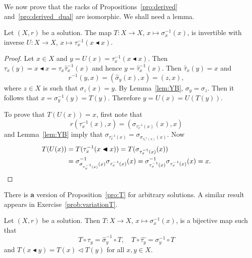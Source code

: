 We now prove that the racks 
of Propositions~\ref{pro:derived} 
and~\ref{pro:derived_dual} are isomorphic. 
We shall need a lemma. 



\begin{lemma}
\label{lem:T_invertible}
Let $(X,r)$ be a solution. 
The map $T\colon X\to X$, $x\mapsto\sigma_x^{-1}(x)$, is invertible with
inverse $U\colon X\to X$, $x\mapsto\tau^{-1}_x(x\blacktriangleleft x)$. 
\end{lemma}

\begin{proof}
Let $x\in X$ and $y=U(x)=\tau^{-1}_x(x\blacktriangleleft x)$. 
Then $\tau_x(y)=x\blacktriangleleft x=\tau_x\widehat{\tau}^{-1}_x(x)$ and hence
$y=\widehat{\tau}^{-1}_x(x)$. Then $\widehat{\tau}_x(y)=x$ and 
\[
r^{-1}(y,x)=(\widehat{\sigma}_y(x),x)=(z,x),
\]
where $z\in X$ is such that $\sigma_z(x)=y$. By Lemma~\ref{lem:YB}, $\sigma_y=\sigma_z$. Then 
it follows that $x=\sigma^{-1}_y(y)=T(y)$. Therefore $y=U(x)=U(T(y))$.

To prove that $T(U(x))=x$, first note that 
\[
r(\tau^{-1}_x(x),x)=(\sigma_{\tau^{-1}_x(x)}(x),x)
\]
and Lemma~\ref{lem:YB} imply that $\sigma_{\tau^{-1}_x(x)}=\sigma_{\sigma_{\tau^{-1}_x(x)}(x)}$. Now
\begin{align*}
T(U(x))&=T(\tau^{-1}_x(x\blacktriangleleft x))=T(\sigma_{\tau^{-1}_x(x)}(x))\\
&=\sigma^{-1}_{\sigma_{\tau^{-1}_x(x)}(x)}\sigma_{\tau^{-1}_x(x)}(x)
=\sigma^{-1}_{\tau^{-1}_x(x)}\sigma_{\tau^{-1}_x(x)}(x)=x.\qedhere
\end{align*}
\end{proof}

There is {\bf a} version of Proposition~\ref{pro:T} for arbitrary solutions. 
A similar result appears in Exercise~\ref{prob:variationT}.



\begin{proposition}
    Let $(X,r)$ be a solution. Then $T\colon X\to X$, $x\mapsto\sigma_x^{-1}(x)$, is a bijective
    map such that 
    \[
      T\circ\tau_y=\widehat{\sigma}^{-1}_y\circ T,
      \quad
      T\circ \widehat{\tau_y}=\sigma^{-1}_{y}\circ T
    \]
    and $T(x\blacktriangleleft y)=T(x)\triangleleft T(y)$ for all $x,y\in X$. 
\end{proposition}

